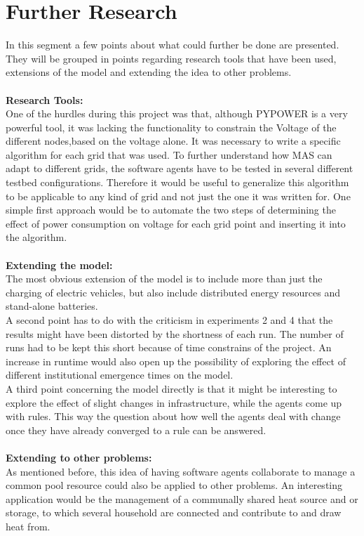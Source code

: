 \documentclass[a4paper]{article}
\begin{document}
\section{Further Research}
In this segment a few points about what could further be done are presented. They will be grouped in points regarding research tools that
have been used, extensions of the model and extending the idea to other problems. \\ \\
\textbf{Research Tools:}\\
One of the hurdles during this project was that, although PYPOWER is a very powerful tool, it was lacking the functionality to 
constrain the Voltage of the different nodes,based on the voltage alone. It was necessary to write a specific algorithm for each 
grid that was used. To further understand how MAS can adapt to different grids, the software agents have to be 
tested in several different testbed configurations. 
Therefore it would be useful to generalize this algorithm to be applicable to any kind of grid and not just the one it was 
written for. One simple first approach would be to automate the two steps of determining the effect of power consumption on 
voltage for each grid point and inserting it into  the algorithm.
\\
\\
\textbf{Extending the model:}\\
The most obvious extension of the model is to include more than just the charging of electric vehicles, but also include distributed 
energy resources  and stand-alone batteries. \\
A second point has to do with the criticism in experiments 2 and 4 that the results might have been distorted by the shortness of each run. 
The number of runs had to be kept this short because of time constrains of the project. An increase in runtime would also open up the 
possibility of exploring the effect of different institutional emergence times on the model.\\
A third point concerning the model directly is that it might be interesting to explore the effect of slight changes in infrastructure, 
while the agents come up with rules. This way the question about how well the agents deal with change once they have already 
converged to a rule can be answered.
\\
\\
\textbf{Extending to other problems:}\\
As mentioned before, this idea of having software agents collaborate to manage a common pool resource could also be applied to other 
problems. An interesting application would be the management of a communally shared heat source and or storage, to which several 
household are connected and contribute to  and draw heat from. 
\clearpage
\end{document}
